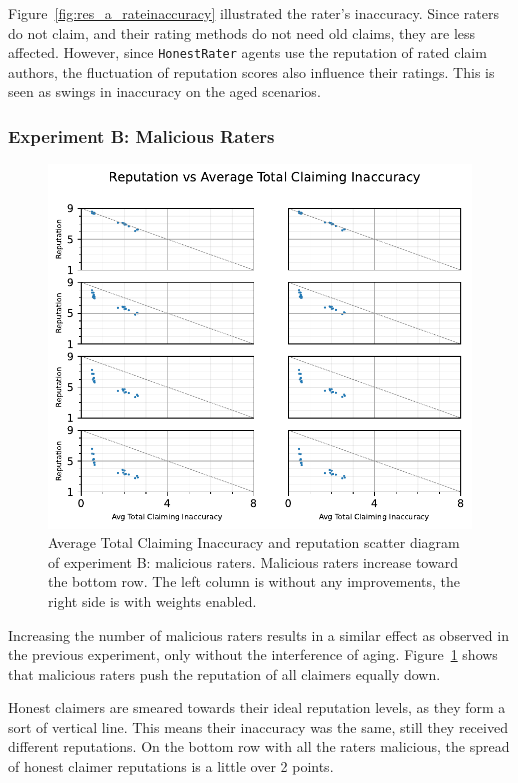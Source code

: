 \documentclass[%
    ]{\PathToTumTemplate/thesis/tum_thesis}
\begin{document}
Figure~\ref{fig:res_a_rateinaccuracy} illustrated the rater's inaccuracy. Since raters do not claim, and their rating methods do not need old claims, they are less affected. 
However, since \texttt{HonestRater} agents use the reputation of rated claim authors, the fluctuation of reputation scores also influence their ratings. 
This is seen as swings in inaccuracy on the aged scenarios.

\subsubsection{Experiment B: Malicious Raters}

\begin{figure}[]
  \begin{center}
        \includegraphics[width=0.75\linewidth]	{../results/b/AvgTotClaimInaccuracyAndReputationScatter_joined.pdf}
    \caption{
    Average Total Claiming Inaccuracy and reputation scatter diagram of experiment B: malicious raters.
    Malicious raters increase toward the bottom row.
    The left column is without any improvements, the right side is with weights enabled.
    }
    \label{fig:res_b_scatter}
  \end{center}
\end{figure}

Increasing the number of malicious raters results in a similar effect as observed in the previous experiment, only without the interference of aging.
Figure~\ref{fig:res_b_scatter} shows that malicious raters push the reputation of all claimers equally down.

Honest claimers are smeared towards their ideal reputation levels, as they form a sort of vertical line.
This means their inaccuracy was the same, still they received different reputations.
On the bottom row with all the raters malicious, the spread of honest claimer reputations is a little over 2 points.
\end{document}
